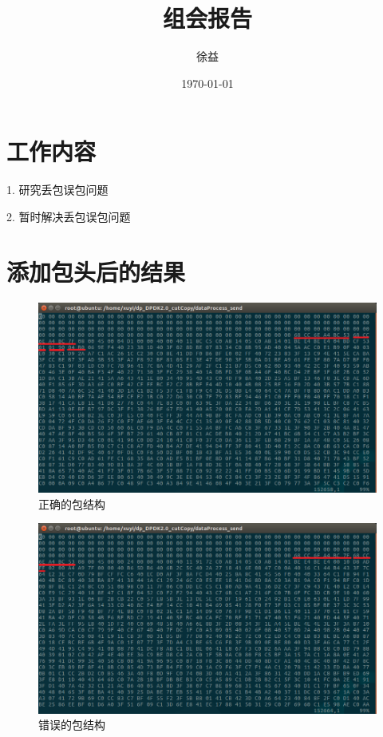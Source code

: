 \documentclass{article}
\title{组会报告}
\author{徐益}
\date{\today}
\begin{document}
\maketitle


\section{工作内容}

1. 研究丢包误包问题

2. 暂时解决丢包误包问题

\section{添加包头后的结果}

\begin{figure}[H]
	\centering
	\includegraphics[width = \textwidth]{package-right.png}
	\caption{正确的包结构}
\end{figure}
\begin{figure}[H]
	\centering
	\includegraphics[width = \textwidth]{package-wrong.png}
	\caption{错误的包结构}
\end{figure}
\end{document}
